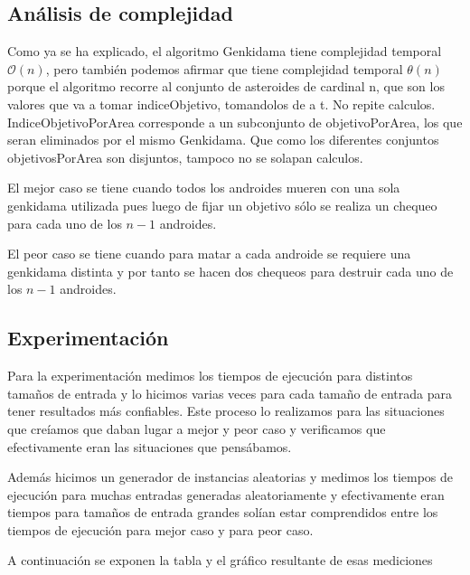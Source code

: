 \documentclass[10pt,a4paper]{article}
\begin{document}
\subsection{Análisis de complejidad}

\par{Como ya se ha explicado, el algoritmo Genkidama tiene complejidad temporal $\mathcal{O}(n)$, pero también podemos afirmar que tiene complejidad temporal $\mathcal{\theta}(n)$ porque el algoritmo recorre al conjunto de asteroides de cardinal n, que son los valores que va a tomar indiceObjetivo, tomandolos de a t. No repite calculos. IndiceObjetivoPorArea corresponde a un subconjunto de objetivoPorArea, los que seran eliminados por el mismo Genkidama. Que como los diferentes conjuntos objetivosPorArea son disjuntos, tampoco no se solapan calculos.}
\par{El mejor caso se tiene cuando todos los androides mueren con una sola genkidama utilizada pues luego de fijar un objetivo sólo se realiza un chequeo para cada uno de los $n-1$ androides.}
\par{El peor caso se tiene cuando para matar a cada androide se requiere una genkidama distinta y por tanto se hacen dos chequeos para destruir cada uno de los $n-1$ androides.}
\newpage
\subsection{Experimentación}
Para la experimentación medimos los tiempos de ejecución para distintos tamaños de entrada y lo hicimos varias veces para cada tamaño de entrada para tener resultados más confiables. Este proceso lo realizamos para las situaciones que creíamos que daban lugar a mejor y peor caso y verificamos que efectivamente eran las situaciones que pensábamos.
\par{Además hicimos un generador de instancias aleatorias y medimos los tiempos de ejecución para muchas entradas generadas aleatoriamente y efectivamente eran tiempos para tamaños de entrada grandes solían estar comprendidos entre los tiempos de ejecución para mejor caso y para peor caso.}
\par{A continuación se exponen la tabla y el gráfico resultante de esas mediciones}\\
\end{document}
